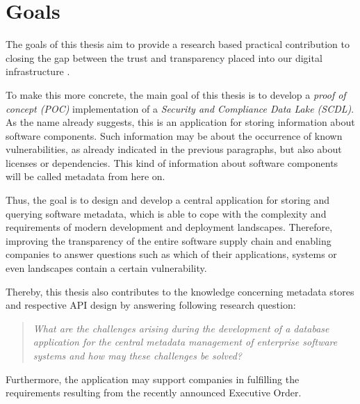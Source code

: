 \section{Goals}
The goals of this thesis aim to provide a research based practical contribution to closing the gap between the trust and transparency placed into our digital infrastructure \cite{ExecutiveOrderSBOM}.\par 
To make this more concrete, the main goal of this thesis is to develop a \textit{proof of concept (POC)} implementation of a \textit{Security and Compliance Data Lake (SCDL)}. As the name already suggests, this is an application for storing information about software components. Such information may be about the occurrence of known vulnerabilities, as already indicated in the previous paragraphs, but also about licenses or dependencies. This kind of information about software components will be called metadata from here on.\par
Thus, the goal is to design and develop a central application for storing and querying software metadata, which is able to cope with the complexity and requirements of modern development and deployment landscapes. Therefore, improving the transparency of the entire software supply chain and enabling companies to answer questions such as which of their applications, systems or even landscapes contain a certain vulnerability.\par
Thereby, this thesis also contributes to the knowledge concerning metadata stores and respective API design by answering following research question:
\begin{quote}
	\emph{What are the challenges arising during the development of a database application for the central metadata management of enterprise software systems and how may these challenges be solved?}
\end{quote}

Furthermore, the application may support companies in fulfilling the requirements resulting from the recently announced Executive Order. 

